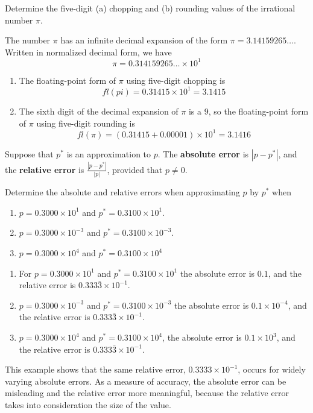 \begin{example}
Determine the five-digit (a) chopping and (b) rounding values of the irrational number $\pi$.
\end{example}
\begin{mysolution}
The number $\pi$ has an infinite decimal expansion of the form $\pi=3.14159265\ldots$. Written in normalized decimal form, we have
\[\pi=0.314159265\ldots\times 10^1\]
\begin{enumerate}[label=(\alph*)]
\item The floating-point form of $\pi$ using five-digit chopping is
\[fl(pi)=0.31415\times10^1=3.1415\]
\item The sixth digit of the decimal expansion of $\pi$ is a $9$, so the floating-point form of  $\pi$ using five-digit rounding is
\[fl(\pi)=(0.31415+0.00001)\times10^1=3.1416\]
\end{enumerate}
\end{mysolution}

\begin{definition}
Suppose that $p^*$ is an approximation to $p$. The {\bf absolute error} is $|p −p^*|$, and the {\bf relative
 error} is $\frac{|p −p^*|}{|p|}$, provided that $p\neq0$.
\end{definition}


\begin{example}
Determine the absolute and relative errors when approximating $p$ by $p^*$ when
\begin{enumerate}[label=(\alph*)]
\item $p=0.3000\times10^1$ and $p^*=0.3100\times10^1$.
\item $p=0.3000\times10^{-3}$ and $p^*=0.3100\times10^{-3}$.
\item $p=0.3000\times10^4$ and $p^*=0.3100\times10^4$
\end{enumerate}
\end{example}

\begin{mysolution}
\begin{enumerate}[label=(\alph*)]
\item For $p=0.3000\times10^1$ and $p^*=0.3100\times10^1$ the absolute error is $0.1$, and the relative error is $0.333\bar{3}\times10^{-1}$.
\item $p=0.3000\times10^{-3}$ and $p^*=0.3100\times10^{-3}$ the absolute error is $0.1\times10^{-4}$, and the relative error is $0.333\bar{3}\times10^{-1}$.
\item $p=0.3000\times10^4$ and $p^*=0.3100\times10^4$, the absolute error is $0.1\times10^3$, and the relative error is $0.333\bar{3}\times10^{-1}$.
\end{enumerate}
This example shows that the same relative error, $0.3333\times10^{-1}$, occurs for widely varying  absolute errors. As a measure of accuracy, the absolute error can be misleading and the relative error more meaningful, because the relative error takes into consideration the size of the value.
\end{mysolution}

